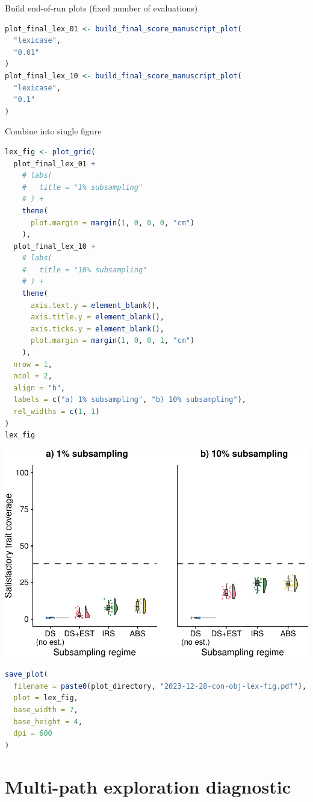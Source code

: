 \documentclass[
]{book}
\begin{document}
Build end-of-run plots (fixed number of evaluations)

\begin{lstlisting}[language=R]
plot_final_lex_01 <- build_final_score_manuscript_plot(
  "lexicase",
  "0.01"
)
plot_final_lex_10 <- build_final_score_manuscript_plot(
  "lexicase",
  "0.1"
)
\end{lstlisting}

Combine into single figure

\begin{lstlisting}[language=R]
lex_fig <- plot_grid(
  plot_final_lex_01 +
    # labs(
    #   title = "1% subsampling"
    # ) +
    theme(
      plot.margin = margin(1, 0, 0, 0, "cm")
    ),
  plot_final_lex_10 +
    # labs(
    #   title = "10% subsampling"
    # ) +
    theme(
      axis.text.y = element_blank(),
      axis.title.y = element_blank(),
      axis.ticks.y = element_blank(),
      plot.margin = margin(1, 0, 0, 1, "cm")
    ),
  nrow = 1,
  ncol = 2,
  align = "h",
  labels = c("a) 1% subsampling", "b) 10% subsampling"),
  rel_widths = c(1, 1)
)
lex_fig
\end{lstlisting}

\includegraphics{phylogeny-informed-subsampling-supplemental_files/figure-latex/unnamed-chunk-48-1.pdf}

\begin{lstlisting}[language=R]
save_plot(
  filename = paste0(plot_directory, "2023-12-28-con-obj-lex-fig.pdf"),
  plot = lex_fig,
  base_width = 7,
  base_height = 4,
  dpi = 600
)
\end{lstlisting}

\hypertarget{multi-path-exploration-diagnostic}{%
\chapter{Multi-path exploration diagnostic}\label{multi-path-exploration-diagnostic}}
\end{document}
